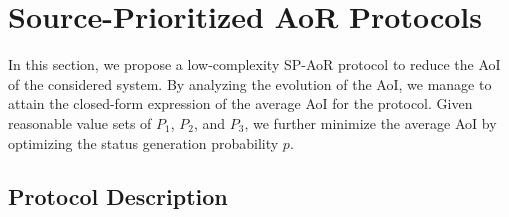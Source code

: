 \documentclass{IEEEtran}
\newtheorem{theorem}{Theorem}
\begin{document}
%
%	
%	
%

\vspace{-0.12cm}
\section{Source-Prioritized AoR Protocols}\label{3}

In this section, we propose a low-complexity SP-AoR protocol to reduce the AoI of the considered system. By analyzing the evolution of the AoI, we manage to attain the closed-form expression of the average AoI for the protocol. Given reasonable value sets of $P_1$, $P_2$, and $P_3$, we further minimize the average AoI by optimizing the status generation probability $p$. 
\vspace{-0.12cm}
\subsection{Protocol Description}
\end{document}
